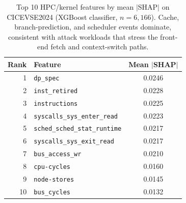\begin{table}[t]
\centering
\caption{Top 10 HPC/kernel features by mean $|$SHAP$|$ on CICEVSE2024 (XGBoost classifier, $n=6{,}166$). Cache, branch-prediction, and scheduler events dominate, consistent with attack workloads that stress the front-end fetch and context-switch paths.}
\label{tab:shap}
\begin{tabular}{rlc}
\toprule
Rank & Feature & Mean $|$SHAP$|$ \\
\midrule
1 & \texttt{dp\_spec} & 0.0246 \\
2 & \texttt{inst\_retired} & 0.0228 \\
3 & \texttt{instructions} & 0.0225 \\
4 & \texttt{syscalls\_sys\_enter\_read} & 0.0223 \\
5 & \texttt{sched\_sched\_stat\_runtime} & 0.0217 \\
6 & \texttt{syscalls\_sys\_exit\_read} & 0.0217 \\
7 & \texttt{bus\_access\_wr} & 0.0210 \\
8 & \texttt{cpu-cycles} & 0.0160 \\
9 & \texttt{node-stores} & 0.0145 \\
10 & \texttt{bus\_cycles} & 0.0132 \\
\bottomrule
\end{tabular}
\end{table}
